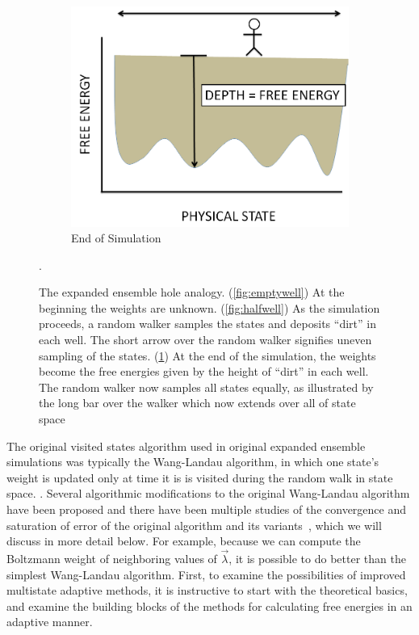 \documentclass[superscriptaddress,showkeys, nofootinbib, pre, aps]{revtex4-1}
\begin{document}
\begin{figure}[H]
        \begin{subfigure}[b]{0.3\textwidth}
                \centering
                \includegraphics[width=\textwidth]{figures/fullwell.png}
                \caption{End of Simulation}
                \label{fig:fullwell}
        \end{subfigure}
        \caption{The expanded ensemble hole analogy. (\ref{fig:emptywell}) At the beginning the weights are unknown. (\ref{fig:halfwell}) As the simulation proceeds, a random walker samples the states and deposits ``dirt'' in each well.  The short arrow over the random walker signifies uneven sampling of the states.  (\ref{fig:fullwell}) At the end of the simulation, the weights become the free energies given by the height of ``dirt'' in each well.  The random walker now samples all states equally, as illustrated by the long bar over the walker which now extends over all of state space} \label{fig:EXEanalogy}.
\end{figure}

The original visited states algorithm used in original expanded ensemble simulations was typically the Wang-Landau algorithm, in which one state's weight is updated only at time it is is visited during the random walk in state space.
\cite{wang-landau:prl:2001:wang-landau}.  Several algorithmic modifications to the original Wang-Landau algorithm have been proposed
and there have been multiple studies of the convergence and saturation of error of the original algorithm and its
variants~\cite{Belardinelli2007, Belardinelli2008}, which we will discuss in more detail below. For example, because we can compute the Boltzmann weight of neighboring values of $\vec{\lambda}$, it is possible to do better than the simplest Wang-Landau algorithm. First, to examine the possibilities of improved multistate adaptive methods, it is instructive to start with the theoretical basics, and examine the building blocks of the methods for calculating free energies in an adaptive manner.
\end{document}
